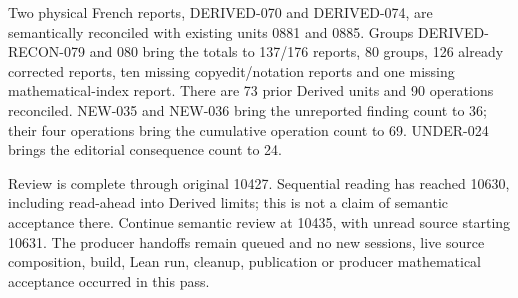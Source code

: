 Two physical French reports,\allowbreak{} DERIVED-070 and DERIVED-074,\allowbreak{} are semantically reconciled with existing units 0881 and 0885. Groups DERIVED-RECON-079 and 080 bring the totals to 137/\allowbreak{}176 reports,\allowbreak{} 80 groups,\allowbreak{} 126 already corrected reports,\allowbreak{} ten missing copyedit/\allowbreak{}notation reports and one missing mathematical-index report. There are 73 prior Derived units and 90 operations reconciled. NEW-035 and NEW-036 bring the unreported finding count to 36; their four operations bring the cumulative operation count to 69. UNDER-024 brings the editorial consequence count to 24.

Review is complete through original 10427. Sequential reading has reached 10630,\allowbreak{} including read-ahead into Derived limits; this is not a claim of semantic acceptance there. Continue semantic review at 10435,\allowbreak{} with unread source starting 10631. The producer handoffs remain queued and no new sessions,\allowbreak{} live source composition,\allowbreak{} build,\allowbreak{} Lean run,\allowbreak{} cleanup,\allowbreak{} publication or producer mathematical acceptance occurred in this pass.
